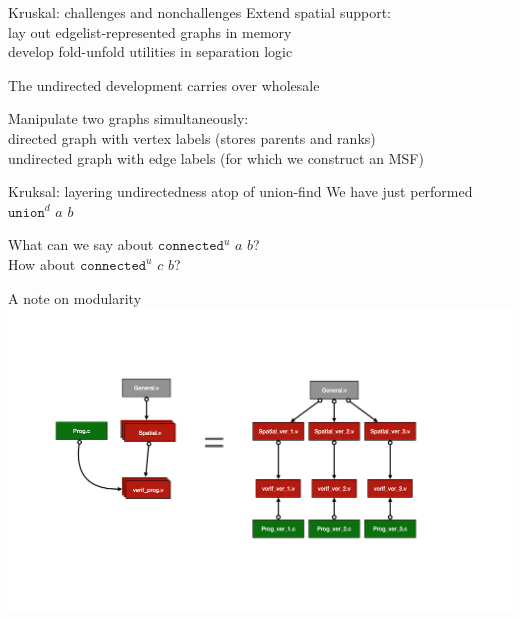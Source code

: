 \documentclass[usenames, xcolor=dvipsnames]{beamer}
\newcommand{\m}[1]{\ensuremath{\mathit{#1}}} %
\begin{document}
\begin{frame}{Kruskal: challenges and nonchallenges}
Extend spatial support: \\
\hspace{1em} lay out edgelist-represented graphs in memory \\
\hspace{1em} develop fold-unfold utilities in separation logic

\bigskip

The undirected development carries over wholesale

\bigskip

Manipulate two graphs simultaneously: \\
\hspace{1em}directed graph with vertex labels (stores parents and ranks) \\
\hspace{1em}undirected graph with edge labels (for which we construct an MSF)
\end{frame}

\begin{frame}{Kruksal: layering undirectedness atop of union-find}
  We have just performed $\texttt{union}^{d}$ \m{a} \m{b} \\
  \vspace{2em}
  {\centering
  
  
  }
 \pause \bigskip
  What can we say about $\texttt{connected}^{u}$ \m{a} \m{b}? \\
  How about $\texttt{connected}^{u}$ \m{c} \m{b}?
\end{frame}

\begin{frame}{A note on modularity}
\centering
  \includegraphics[scale=0.33]{key}
\end{frame}
\end{document}
